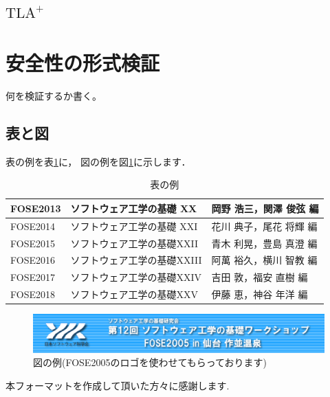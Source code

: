 \documentclass{fose2019}           %
\begin{document}
\subsection{$\textrm{TLA}^{+}$}

\section{安全性の形式検証}
何を検証するか書く。

\subsection{表と図}

表の例を表\ref{tab:example}に，
図の例を図\ref{fig:example}に示します．

\begin{table}[htbp]
  \centering
  \caption{表の例} \label{tab:example}
  \begin{tabular}{|l|l|l|}\hline
    FOSE2013 & ソフトウェア工学の基礎 XX & 岡野 浩三，関澤 俊弦 編 \\ \hline
    FOSE2014 & ソフトウェア工学の基礎 XXI& 花川 典子，尾花 将輝 編\\ \hline
    FOSE2015 & ソフトウェア工学の基礎XXII & 青木 利晃，豊島 真澄 編\\ \hline
    FOSE2016 & ソフトウェア工学の基礎XXIII & 阿萬 裕久，横川 智教 編\\ \hline
    FOSE2017 & ソフトウェア工学の基礎XXIV & 吉田 敦，福安 直樹 編\\ \hline
    FOSE2018 & ソフトウェア工学の基礎XXV & 伊藤 恵，神谷 年洋  編\\ \hline
  \end{tabular}
\end{table}

\begin{figure}[htbp]
  \centering
  \includegraphics[width=\textwidth]{fose2005logo.eps}
  \caption{図の例(FOSE2005のロゴを使わせてもらっております)}
  \label{fig:example}
\end{figure}



本フォーマットを作成して頂いた方々に感謝します.
\end{document}
